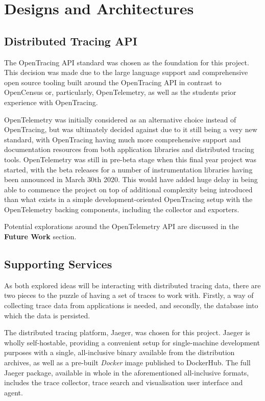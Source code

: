 \documentclass[12pt,pdftex,titlepage]{report}
\begin{document}
        \section{Designs and Architectures}
            \subsection{Distributed Tracing API}
                The OpenTracing API standard was chosen as the foundation for this project. This decision was made due to the large language support and comprehensive open
                source tooling built around the OpenTracing API in contrast to OpenCensus or, particularly, OpenTelemetry, as well as the students prior experience with OpenTracing.

                OpenTelemetry was initially considered as an alternative choice instead of OpenTracing, but was ultimately decided against due to it still being a very new
                standard, with OpenTracing having much more comprehensive support and documentation resources from both application libraries and distributed tracing tools.
                OpenTelemetry was still in pre-beta stage when this final year project was started, with the beta releases for a number of instrumentation libraries having been
                announced in March 30th 2020. This would have added huge delay in being able to commence the project on top of additional complexity being introduced than what exists 
                in a simple development-oriented OpenTracing setup with the OpenTelemetry backing components, including the collector and exporters.

                Potential explorations around the OpenTelemetry API are discussed in the \textbf{Future Work} section.

            \newpage
            \subsection{Supporting Services}
                As both explored ideas will be interacting with distributed tracing data, there are two pieces to the puzzle of having a set of traces to work with.
                Firstly, a way of collecting trace data from applications is needed, and secondly, the database into which the data is persisted.
                
                The distributed tracing platform, Jaeger, was chosen for this project. Jaeger is wholly self-hostable, providing a convenient setup for single-machine development purposes with
                a single, all-inclusive binary available from the distribution archives, as well as a pre-built \textit{Docker} image published to DockerHub. The full Jaeger package,
                available in whole in the aforementioned all-inclusive formats, includes the trace collector, trace search and visualisation user interface and agent.
\end{document}
